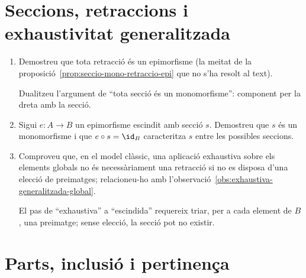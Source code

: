 \section{Seccions, retraccions i exhaustivitat generalitzada}

\begin{enumerate}[resume]
  \item Demostreu que tota retracció és un epimorfisme (la meitat de la proposició~\ref{prop:seccio-mono-retraccio-epi} que no s'ha resolt al text). \begin{indicacio}Dualitzeu l'argument de \enquote{tota secció és un monomorfisme}: component per la dreta amb la secció.\end{indicacio}

  \item Sigui \(e:A\to B\) un epimorfisme escindit amb secció \(s\). Demostreu que \(s\) és un monomorfisme i que \(e\circ s=\id_B\) caracteritza \(s\) entre les possibles seccions. 

  \item Comproveu que, en el model clàssic, una aplicació exhaustiva sobre els elements globals no és necessàriament una retracció si no es disposa d'una elecció de preimatges; relacioneu-ho amb l'observació~\ref{obs:exhaustiva-generalitzada-global}. \begin{indicacio}El pas de \enquote{exhaustiva} a \enquote{escindida} requereix triar, per a cada element de \(B\), una preimatge; sense elecció, la secció pot no existir.\end{indicacio}
\end{enumerate}

\section{Parts, inclusió i pertinença}

